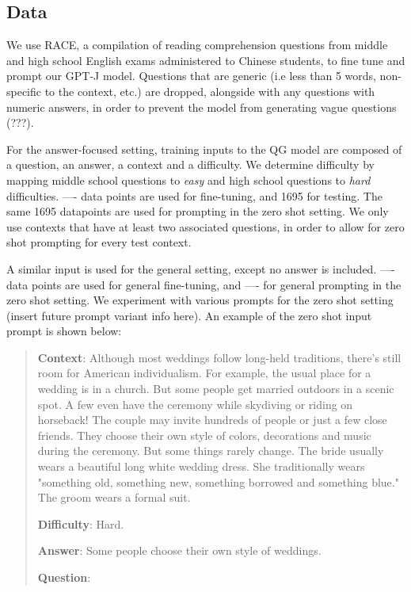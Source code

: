 \documentclass[11pt]{article}
\begin{document}
\subsection{Data}

We use RACE, a compilation of reading comprehension questions from middle and high school English exams administered to Chinese students, to fine tune and prompt our GPT-J model. Questions that are generic (i.e less than 5 words, non-specific to the context, etc.) are dropped, alongside with any questions with numeric answers, in order to prevent the model from generating vague questions (???). 

For the answer-focused setting, training inputs to the QG model are composed of a question, an answer, a context and a difficulty. We determine difficulty by mapping middle school questions to \textit{easy} and high school questions to \textit{hard} difficulties.   ---- data points are used for fine-tuning, and 1695 for testing. The same 1695 datapoints are used for prompting in the zero shot setting. We only use contexts that have at least two associated questions, in order to allow for zero shot prompting for every test context.  

A similar input is used for the general setting, except no answer is included.  ---- data points are used for general fine-tuning, and ---- for general prompting in the zero shot setting. We experiment with various prompts for the zero shot setting (insert future prompt variant info here). An example of the zero shot input prompt is shown below: 

\begin{quote}
\textbf{Context}: Although most weddings follow long-held traditions, there's still room for American individualism. For example, the usual place for a wedding is in a church. But some people get married outdoors in a scenic spot. A few even have the ceremony while skydiving or riding on horseback! The couple may invite hundreds of people or just a few close friends. They choose their own style of colors, decorations and music during the ceremony. But some things rarely change. The bride usually wears a beautiful long white wedding dress. She traditionally wears "something old, something new, something borrowed and something blue." The groom wears a formal suit.

\textbf{Difficulty}: Hard. 

\textbf{Answer}: Some people choose their own style of weddings. 

\textbf{Question}:

\end{quote}
\end{document}
